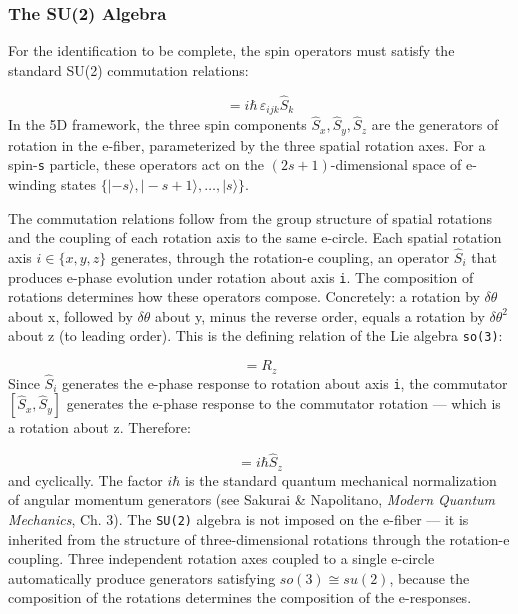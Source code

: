 \documentclass[aps,prd,preprint,superscriptaddress,longbibliography,floatfix]{revtex4-2}
\theoremstyle{remark}
\begin{document}
\subsubsection{The SU(2) Algebra}

For the identification to be complete, the spin operators must satisfy the standard SU(2) commutation relations:


\begin{equation}
    [\hat{S}_i, \hat{S}_j] = i\hbar \, \varepsilon_{ijk} \hat{S}_k
\end{equation}
In the 5D framework, the three spin components $\hat{S}_x, \hat{S}_y, \hat{S}_z$ are the generators of rotation in the e-fiber, parameterized by the three spatial rotation axes. For a spin-\texttt{s} particle, these operators act on the $(2s + 1)$-dimensional space of e-winding states $\{|-s\rangle, |-s+1\rangle, \ldots, |s\rangle\}$.

The commutation relations follow from the group structure of spatial rotations and the coupling of each rotation axis to the same e-circle. Each spatial rotation axis $i \in \{x, y, z\}$ generates, through the rotation-e coupling, an operator $\hat{S}_i$ that produces e-phase evolution under rotation about axis \texttt{i}. The composition of rotations determines how these operators compose. Concretely: a rotation by $\delta\theta$ about x, followed by $\delta\theta$ about y, minus the reverse order, equals a rotation by $\delta\theta^{2}$ about z (to leading order). This is the defining relation of the Lie algebra \texttt{so(3)}:


\begin{equation}
    [R_x, R_y] = R_z
\end{equation}
Since $\hat{S}_i$ generates the e-phase response to rotation about axis \texttt{i}, the commutator $[\hat{S}_x, \hat{S}_y]$ generates the e-phase response to the commutator rotation --- which is a rotation about z. Therefore:


\begin{equation}
    [\hat{S}_x, \hat{S}_y] = i\hbar \hat{S}_z
\end{equation}
and cyclically. The factor $i\hbar$ is the standard quantum mechanical normalization of angular momentum generators (see Sakurai \& Napolitano, \textit{Modern Quantum Mechanics}, Ch. 3). The \texttt{SU(2)} algebra is not imposed on the e-fiber --- it is inherited from the structure of three-dimensional rotations through the rotation-e coupling. Three independent rotation axes coupled to a single e-circle automatically produce generators satisfying $so(3) \cong su(2)$, because the composition of the rotations determines the composition of the e-responses.
\end{document}

